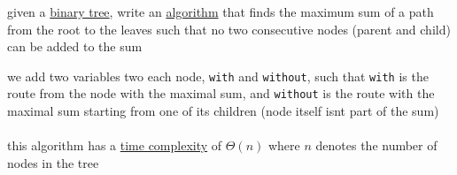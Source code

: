 \documentclass[a4paper,12pt]{article}
\newcommand{\?}{\stackrel{?}{=}}
\begin{document}
\newenvironment{note}
  {\begin{bclogo}[logo=\bcinfo, couleurBarre=orange, couleur=lightgray]{ note}}
  {\end{bclogo}}
\newenvironment{attention}
  {\begin{bclogo}[logo=\bcattention, couleurBarre=red, noborder=true, 
                couleur=red!15]{Important!}}
  {\end{bclogo}}

\begin{question}
given a \href{data_structures.org}{binary tree}, write an \href{20220706211958-algorithm.org}{algorithm} that finds the maximum sum of a path from the root to the leaves such that no two consecutive nodes (parent and child) can be added to the sum\\[0pt]
\begin{answer}
we add two variables two each node, \texttt{with} and \texttt{without}, such that \texttt{with} is the route from the node with the maximal sum, and \texttt{without} is the route with the maximal sum starting from one of its children (node itself isnt part of the sum)\\[0pt]
\\[0pt]

this algorithm has a \href{20221130014441-time_complexity.org}{time complexity} of \(\Theta(n)\) where \(n\) denotes the number of nodes in the tree\\[0pt]
\end{answer}
\end{question}
\end{document}

